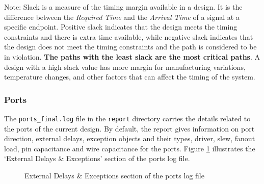 \documentclass[a4paper,11pt]{article}%
\begin{document}
Note: Slack is a measure of the timing margin available in a design. It is the difference between the \textit{Required Time} and the \textit{Arrival Time} of a signal at a specific endpoint. Positive slack indicates that the design meets the timing constraints and there is extra time available, while negative slack indicates that the design does not meet the timing constraints and the path is considered to be in violation. \textbf{The paths with the least slack are the most critical paths}. A design with a high slack value has more margin for manufacturing variations, temperature changes, and other factors that can affect the timing of the system.



\subsubsection{Ports}

The {\tt ports\_final.log} file in the {\tt report} directory carries the details related to the ports of the current design. By default, the report gives information on port direction, external delays, exception objects and their types, driver, slew, fanout load, pin capacitance and wire capacitance for the ports\cite{genus_command_ref_2019}. Figure \ref{fig:ports_log} illustrates the `External Delays \& Exceptions' section of the ports log file.

\begin{figure}[h]
	\centering
	\caption{External Delays \& Exceptions section of the ports log file}
	\label{fig:ports_log}
\end{figure}

\pagebreak



\end{document}
